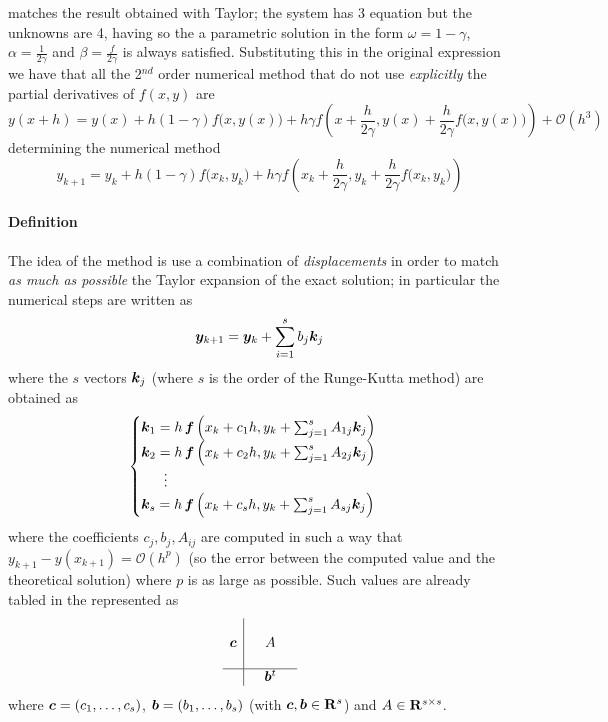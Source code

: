 		matches the result obtained with Taylor; the system has 3 equation but the unknowns are 4, having so the a parametric solution in the form $\omega = 1-\gamma$, $\alpha = \frac 1 {2\gamma}$ and $\beta = \frac{f}{2\gamma}$ is always satisfied. Substituting this in the original expression we have that all the 2$^{nd}$ order numerical method that do not use \textit{explicitly} the partial derivatives of $f(x,y)$ are
		\[ y(x+h) = y(x) + h (1-\gamma) f\big(x,y(x)\big) + h \gamma f\left( x + \frac{h}{2\gamma}, y(x) + \frac{h}{2\gamma}f\big(x,y(x)\big) \right) + \mathcal O(h^3) \]
		determining the numerical method
		\begin{equation}
			y_{k+1} = y_k + h (1-\gamma) f\big(x_k,y_k\big) + h \gamma f\left( x_k + \frac{h}{2\gamma}, y_k + \frac{h}{2\gamma}f\big(x_k,y_k\big) \right)
		\end{equation}
	
		\paragraph{Definition} The idea of the  method is use a combination of \textit{displacements} in order to match \textit{as much as possible} the Taylor expansion of the exact solution; in particular the numerical steps are written as
		\begin{equation} \label{eq:ode:rungekutta}
			\boldsymbol{y}_{k+1} = \boldsymbol{y}_k + \sum_{i=1}^{s} b_j \boldsymbol{k}_j
		\end{equation}
		where the $s$ vectors $\boldsymbol{k}_j$ (where $s$ is the order of the Runge-Kutta method) are obtained as
		\begin{equation}
		\begin{cases}
			\boldsymbol{k}_1 = h \, \boldsymbol{f}\left( x_k + c_1 h, y_k + \sum_{j=1}^s A_{1j} \boldsymbol{k}_j \right) \\
			\boldsymbol{k}_2 = h \, \boldsymbol{f}\left( x_k + c_2 h, y_k + \sum_{j=1}^s A_{2j} \boldsymbol{k}_j \right) \\
			\hspace{5.7mm} \vdots \\			
			\boldsymbol{k}_s = h \, \boldsymbol{f}\left( x_k + c_s h, y_k + \sum_{j=1}^s A_{sj} \boldsymbol{k}_j \right) \\
		\end{cases}
		\end{equation}
		where the coefficients $c_j,b_j, A_{ij}$ are computed in such a way that $y_{k+1} - y(x_{k+1}) = \mathcal O(h^p)$ (so the error between the computed value and the theoretical solution) where $p$ is as large as possible. Such values are already tabled in the  represented as
		\begin{equation}
		\begin{array}{c | c c c}
			& \\
			\boldsymbol{c} & & A \\ 
			& \\ \hline  & & \boldsymbol{b}^t & 
		\end{array}
		\end{equation}
		where $\boldsymbol{c} = (c_1, \dots, c_s)$, $\boldsymbol{b} = (b_1,\dots, b_s)$ (with $\boldsymbol{c},\boldsymbol{b} \in \mathbf{R}^s$) and $A\in \mathbf{R}^{s\times s}$.
		

